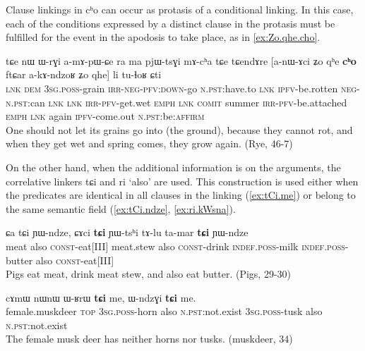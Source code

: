 \documentclass[oldfontcommands,oneside,a4paper,11pt]{article}
\newcommand{\ipa}[1]{{\phon \mbox{#1}}} %
\begin{document}
Clause linkings in \ipa{cʰo} can occur as protasis of a conditional linking. In this case, each of the conditions expressed by a distinct clause in the protasis must be fulfilled for the event in the apodosis to take place, as in \ref{ex:Zo.qhe.cho}.

\begin{exe}
\ex \label{ex:Zo.qhe.cho}
\gll
\ipa{tɕe}  	\ipa{nɯ}  	\ipa{ɯ-rɣi}  	\ipa{a-mɤ-pɯ-ɕe}  	\ipa{ra}  	\ipa{ma}  	\ipa{pjɯ-tsɣi}  	\ipa{mɤ-cʰa}  	\ipa{tɕe}  \ipa{tɕendɤre}  	[\ipa{a-nɯ-ɤci}  	\ipa{ʑo}  	\ipa{qʰe}  	\ipa{\textbf{cʰo}}  	\ipa{ftɕar}  	\ipa{a-kɤ-ndzoʁ}  	\ipa{ʑo}  	\ipa{qhe}]  	\ipa{li}  	\ipa{tu-ɬoʁ}  	\ipa{ɕti}  \\
\textsc{lnk} \textsc{dem} \textsc{3sg.poss}-grain \textsc{irr-neg-pfv:down}-go \textsc{n.pst}:have.to \textsc{lnk} \textsc{ipfv}-be.rotten \textsc{neg-n.pst}:can \textsc{lnk} \textsc{lnk} \textsc{irr-pfv}-get.wet \textsc{emph} \textsc{lnk} \textsc{comit} summer \textsc{irr-pfv}-be.attached \textsc{emph} \textsc{lnk} again \textsc{ipfv}-come.out \textsc{n.pst}:be:\textsc{affirm}\\
\glt One should not let its grains go into (the ground), because they cannot rot, and when they get wet and   spring comes, they grow again. (Rye, 46-7)
\end{exe}




On the other hand, when the additional information is on the arguments, the correlative linkers \ipa{tɕi} and \ipa{ri} `also' are used. This construction is used either when the predicates are identical in all clauses in the linking (\ref{ex:tCi.me}) or belong to the same semantic field (\ref{ex:tCi.ndze}, \ref{ex:ri.kWsna}).

 \begin{exe}
\ex \label{ex:tCi.ndze}
\gll
\ipa{ɕa}  	\ipa{tɕi}  	\ipa{ɲɯ-ndze,}  	\ipa{ɕɤci}  	\ipa{\textbf{tɕi}}  	\ipa{ɲɯ-tsʰi}  	\ipa{tɤ-lu}  	\ipa{ta-mar}  	\ipa{\textbf{tɕi}}  	\ipa{ɲɯ-ndze}  \\
meat also \textsc{const}-eat[III] meat.stew also \textsc{const}-drink  \textsc{indef.poss}-milk \textsc{indef.poss}-butter also \textsc{const}-eat[III] \\
\glt  Pigs eat meat, drink meat stew, and also eat butter. (Pigs, 29-30)
\end{exe}


 \begin{exe}
\ex \label{ex:tCi.me}
\gll
\ipa{cɤmɯ}  	\ipa{nɯnɯ}  	\ipa{ɯ-ʁrɯ}  	\ipa{\textbf{tɕi}}  	\ipa{me,}  	\ipa{ɯ-ndzɣi}  	\ipa{\textbf{tɕi}}  	\ipa{me.}  \\
female.muskdeer \textsc{top} \textsc{3sg.poss}-horn also \textsc{n.pst}:not.exist \textsc{3sg.poss}-tusk also \textsc{n.pst}:not.exist \\
\glt The female musk deer has neither horns nor tusks.  (muskdeer, 34)
\end{exe}
\end{document}
